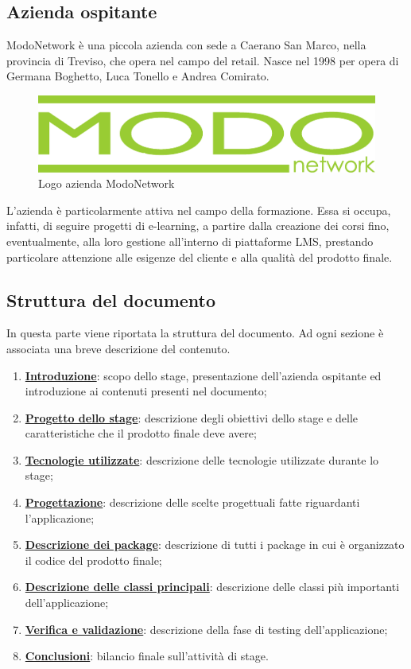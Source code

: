 \documentclass[../Tesi.tex]{subfiles}
\begin{document}
	\subsection{Azienda ospitante}
	ModoNetwork è una piccola azienda con sede a Caerano San Marco, nella provincia di Treviso, che opera nel campo del retail. Nasce nel 1998 per opera di Germana Boghetto, Luca Tonello e Andrea Comirato.
	\begin{figure}[H]
		\centering
		\includegraphics[scale=0.1]{images/logoMN}
		\caption{Logo azienda ModoNetwork}
	\end{figure}
	L'azienda è particolarmente attiva nel campo della formazione. Essa si occupa, infatti, di seguire progetti di e-learning, a partire dalla creazione dei corsi fino, eventualmente, alla loro gestione all'interno di piattaforme LMS, prestando particolare attenzione alle esigenze del cliente e alla qualità del prodotto finale.

	\subsection{Struttura del documento}
		In questa parte viene riportata la struttura del documento. Ad ogni sezione è associata una breve descrizione del contenuto.
		\begin{enumerate}
			\item \hyperref[sec:introduzione]{\textbf{Introduzione}}: scopo dello stage, presentazione dell'azienda ospitante ed introduzione ai contenuti presenti nel documento;
			\item \hyperref[sec:progettoStage]{\textbf{Progetto dello stage}}: descrizione degli obiettivi dello stage e delle caratteristiche che il prodotto finale deve avere;
			\item \hyperref[sec:tecnologieUtilizzate]{\textbf{Tecnologie utilizzate}}: descrizione delle tecnologie utilizzate durante lo stage;
			\item \hyperref[sec:progettazione]{\textbf{Progettazione}}: descrizione delle scelte progettuali fatte riguardanti l'applicazione;
			\item \hyperref[sec:descrizioneDeiPackage]{\textbf{Descrizione dei package}}: descrizione di tutti i package in cui è organizzato il codice del prodotto finale;
			\item \hyperref[sec:descrizioneDelleClassiPrincipali]{\textbf{Descrizione delle classi principali}}: descrizione delle classi più importanti dell'applicazione;
			\item \hyperref[sec:VerificaEValidazione]{\textbf{Verifica e validazione}}: descrizione della fase di testing dell'applicazione;
			\item \hyperref[sec:conclusioni]{\textbf{Conclusioni}}: bilancio finale sull'attività di stage.
		\end{enumerate}
\end{document}
